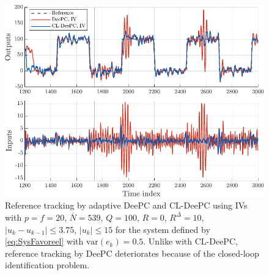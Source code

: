 \begin{figure}
\begin{center}
\includegraphics[width=\columnwidth]{results/figures/fig_prob_sol.pdf}    %
\caption{Reference tracking by adaptive \ac{DeePC} and \ac{CL-DeePC} using \ac{IVs} with $p=f=20$, $\bar{N}=539$, $Q=100$, $R=0$, $R^\Delta=10$, $|u_k-u_{k-1}|\leq3.75$, $|u_k|\leq15$ for the system defined by \eqref{eq:SysFavoreel} with $\text{var}(e_k)=0.5$. %
Unlike with \ac{CL-DeePC}, reference tracking by \ac{DeePC} deteriorates because of the closed-loop identification problem.}  %
\label{fig:CL_Problem_Solution}                                 %
\end{center}                                 %
\end{figure}
